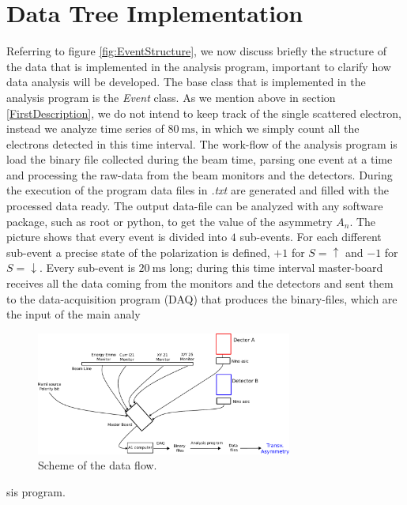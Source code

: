 \newpage
\section{Data Tree Implementation}

Referring to figure \ref{fig:EventStructure}, we now discuss briefly the structure of the data that is implemented in the analysis program, important to clarify how data analysis will be developed.
The base class that is implemented in the analysis program is the \textit{Event} class. As we mention above in section \ref{FirstDescription}, we do not intend to keep track of the single scattered electron, instead we analyze time series of $\SI{80}{\milli \second}$, in which we simply count all the electrons detected in this time interval. The work-flow of the analysis program is load the binary file collected during the beam time, parsing  one event at a time and processing the raw-data from the beam monitors and the detectors. During the execution of the program data files in \textit{.txt} are generated and filled with the processed data ready. The output data-file can be analyzed with any software package, such as root or python, to get the value of the asymmetry $A_{n}$. 
The picture shows that every event is divided into $4$ sub-events. For each different sub-event a precise state of the polarization is defined, 
$+1$ for $S = \uparrow$ and $-1$ for $S = \downarrow$. Every sub-event is $\SI{20}{\milli \second}$ long; during this time interval master-board receives all the data coming from the monitors and the detectors and sent them to the data-acquisition program (DAQ) that produces the binary-files, which are the input of the main analy\begin{figure}[hbtp]

\centering
\includegraphics[width = 0.75\textwidth]{Analysis/Electronic_scheme.pdf}
\caption{Scheme of the data flow.}
\end{figure}
sis program.

